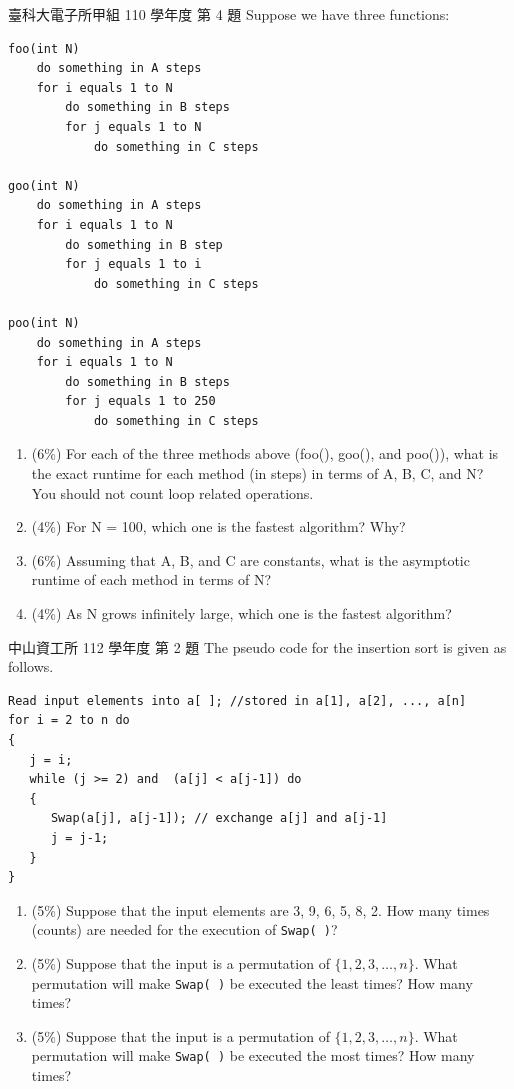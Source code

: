 \begin{pastexam}[label={px:ana-3}]{臺科大電子所甲組 110 學年度 第 4 題}
Suppose we have three functions:
\begin{verbatim}
foo(int N)
    do something in A steps
    for i equals 1 to N
        do something in B steps
        for j equals 1 to N
            do something in C steps

goo(int N)
    do something in A steps
    for i equals 1 to N
        do something in B step
        for j equals 1 to i
            do something in C steps

poo(int N)
    do something in A steps
    for i equals 1 to N
        do something in B steps
        for j equals 1 to 250
            do something in C steps
\end{verbatim}
\begin{enumerate}[label=(\alph*)]
\item (6\%) For each of the three methods above (foo(), goo(), and poo()), what is the
exact runtime for each method (in steps) in terms of A, B, C, and N? You should not count
loop related operations.
\item (4\%) For N = 100, which one is the fastest algorithm? Why?
\item (6\%) Assuming that A, B, and C are constants, what is the asymptotic runtime of
each method in terms of N?
\item (4\%) As N grows infinitely large, which one is the fastest algorithm?
\end{enumerate}
\end{pastexam}

\begin{pastexam}[label={px:ana-4}]{中山資工所 112 學年度 第 2 題}
The pseudo code for the insertion sort is given as follows.
\begin{verbatim}
Read input elements into a[ ]; //stored in a[1], a[2], ..., a[n]
for i = 2 to n do
{
   j = i;
   while (j >= 2) and  (a[j] < a[j-1]) do
   {
      Swap(a[j], a[j-1]); // exchange a[j] and a[j-1]
      j = j-1;
   }
}
\end{verbatim}
\begin{enumerate}[label=(\alph*)]
\item (5\%) Suppose that the input elements are 3, 9, 6, 5, 8, 2. How many times
(counts) are needed for the execution of \texttt{Swap( )}?
\item (5\%) Suppose that the input is a permutation of $\{1,2,3,\ldots,n\}$. What
permutation will make \texttt{Swap( )} be executed the least times? How many times?
\item (5\%) Suppose that the input is a permutation of $\{1,2,3,\ldots,n\}$. What
permutation will make \texttt{Swap( )} be executed the most times? How many times?
\end{enumerate}
\end{pastexam}

